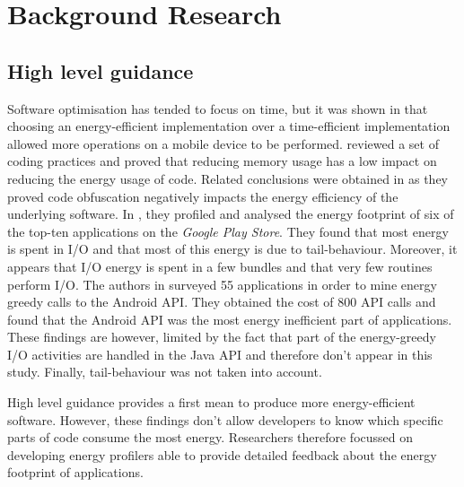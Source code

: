 \section{Background Research}
\label{sec:background}


\subsection{High level guidance}

Software optimisation has tended to focus on time, but it was shown in 
\cite{bunse2009choosing} that choosing an energy-efficient 
implementation over a time-efficient implementation allowed more 
operations on a mobile device to be performed. 
\cite{li2014investigation} reviewed a set of coding practices and proved 
that reducing memory usage has a low impact on reducing the energy usage 
of code. Related conclusions were obtained in \cite{sahin2016does} as 
they proved code obfuscation negatively impacts the energy efficiency of 
the underlying software. In \cite{pathak2012energy}, they profiled and 
analysed the energy footprint of six of the top-ten applications on the 
\textit{Google Play Store}. They found that most energy is spent in I/O 
and that most of this energy is due to tail-behaviour. Moreover, it 
appears that I/O energy is spent in a few bundles and that very few 
routines perform I/O. The authors in \cite{linares2014mining} surveyed 
55 applications in order to mine energy greedy calls to the Android API. 
They obtained the cost of 800 API calls and found that the Android API 
was the most energy inefficient part of applications. These findings are 
however, limited by the fact that part of the energy-greedy I/O 
activities are handled in the Java API and therefore don't appear in 
this study. Finally, tail-behaviour was not taken into account.

High level guidance provides a first mean to produce more 
energy-efficient software. However, these findings don't allow 
developers to know which specific parts of code consume the most energy. 
Researchers therefore focussed on developing energy profilers able to 
provide detailed feedback about the energy footprint of applications.

